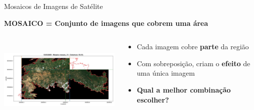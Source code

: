 \documentclass[aspectratio=169,11pt]{beamer}
\begin{document}
\begin{frame}{Mosaicos de Imagens de Satélite}
\vspace{-0.6cm}
\begin{center}
    \colorbox{ufal!10}{\parbox{0.8\textwidth}{\centering\textbf{\color{ufal}MOSAICO = Conjunto de imagens que cobrem uma área}}}
\end{center}

\vspace{0.2cm}
\begin{columns}[T,onlytextwidth]
    \begin{column}{0.55\textwidth}
        \includegraphics[width=\textwidth,height=4.0cm,keepaspectratio]{img/mosaic_example.jpg}
    \end{column}
    \begin{column}{0.45\textwidth}
        \begin{itemize}
            \item Cada imagem cobre \textbf{parte} da região
            \vspace{0.2cm}
            \item Com sobreposição, criam o \textbf{efeito} de uma única imagem
            \vspace{0.2cm}
            \item \textbf{\color{accent}Qual a melhor combinação escolher?}
        \end{itemize}
        
        \vspace{0.4cm}
        \begin{center}
        \end{center}
    \end{column}
\end{columns}
\end{frame}
\end{document}
